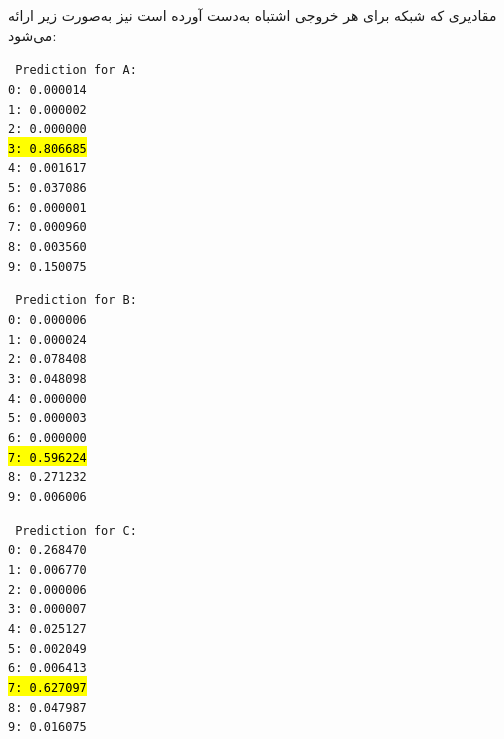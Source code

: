 \begin{qsolve}
	مقادیری که شبکه برای هر خروجی اشتباه به‌دست آورده است نیز به‌صورت زیر ارائه می‌شود:
\begin{latin}
\noindent\begin{multicols}{3}
\texttt{%
	Prediction for A:\\
	0: 0.000014\\
	1: 0.000002\\
	2: 0.000000\\
	\hl{3: 0.806685}\\
	4: 0.001617\\
	5: 0.037086\\
	6: 0.000001\\
	7: 0.000960\\
	8: 0.003560\\
	9: 0.150075
}

\vfill %

\texttt{%
	Prediction for B:\\
	0: 0.000006\\
	1: 0.000024\\
	2: 0.078408\\
	3: 0.048098\\
	4: 0.000000\\
	5: 0.000003\\
	6: 0.000000\\
	\hl{7: 0.596224}\\
	8: 0.271232\\
	9: 0.006006
}

\vfill %

\texttt{%
	Prediction for C:\\
	0: 0.268470\\
	1: 0.006770\\
	2: 0.000006\\
	3: 0.000007\\
	4: 0.025127\\
	5: 0.002049\\
	6: 0.006413\\
	\hl{7: 0.627097}\\
	8: 0.047987\\
	9: 0.016075
}
\end{multicols}
\end{latin}
	
\end{qsolve}



